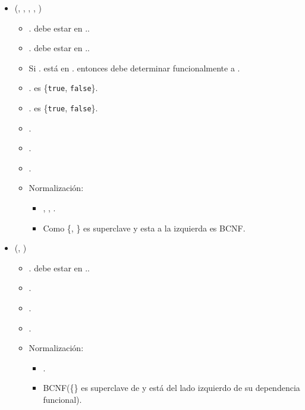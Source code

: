 \begin{itemize}
    \item {}(,
          , , ,
          )
          \begin{itemize}
              \item {}. debe estar en
                    ..
              \item {}. debe estar en
                    ..
              \item Si . está en
                    . entonces  debe determinar
                    funcionalmente a .
              \item {}. es \{\texttt{true},
                    \texttt{false}\}.
              \item {}. es \{\texttt{true},
                    \texttt{false}\}.
              \item {}.
              \item {}.
              \item {}.
              \item Normalización:
                    \begin{itemize}
                        \item {}
                              {, , }.
                        \item Como \{, \} es superclave y esta a la izquierda es
                              BCNF.
                    \end{itemize}
          \end{itemize}

    \item {}(, )
          \begin{itemize}
              \item {}. debe estar en
                    ..
              \item {}.
              \item {}.
              \item \FK{$\emptyset$}.
              \item Normalización:
                    \begin{itemize}
                        \item {}.
                        \item BCNF(\{\} es superclave de  y está del lado
                              izquierdo de su dependencia funcional).
                    \end{itemize}
          \end{itemize}


\end{itemize}
